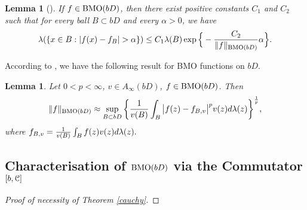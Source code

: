 \documentclass[11pt,a4paper]{amsart}
\numberwithin{equation}{section}
\newtheorem{lemma}[theorem]{Lemma}
\begin{document}
{%

\begin{lemma}[\cite{Kr}]\label{lem-jn1}
If $f\in {\rm BMO}(bD)$, then there exist positive constants $C_1$ and $C_2$ such that for every ball $B\subset bD$ and every $\alpha>0$, we have
$$\lambda(\{x\in B: |f(x)-f_B|>\alpha \})\leq C_1\lambda(B)\exp\Big\{- {C_2\over \|f\|_{{\rm BMO}(bD)}}\alpha\Big\}.$$
\end{lemma}


According to \cite[Theorem 5.5]{HT}, we have the following result for BMO functions on $bD$.

\begin{lemma}\label{bmoqq}
Let $0<p<\infty$, $v\in A_\infty(bD)$, $f\in {\rm{BMO}}(bD)$. Then
$$\|f\|_{{\rm{BMO}}(bD)}\approx\sup_{B\subset bD}\bigg\{{1\over v(B)}\int_B\big| f(z)-f_{B,v} \big|^pv(z)d\lambda(z)  \bigg\}^{1\over p},$$
where $f_{B,v}={1\over v(B)}\int_{B}f(z)v(z)d\lambda(z).$
\end{lemma}














\subsection{Characterisation of ${\rm BMO}(bD)$ via the Commutator $[b, \EuScript C]$ }


\begin{proof}[Proof of necessity of  Theorem \ref{cauchy}]


\end{proof}}
\end{document}
